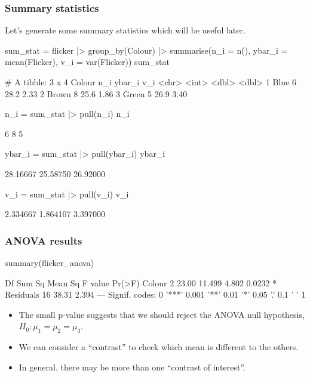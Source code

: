 \documentclass[a4paper]{article}\usepackage[]{graphicx}\usepackage[]{xcolor}
\begin{document}
\subsubsection{Summary statistics}
Let's generate some summary statistics which will be useful later.
\begin{Schunk}
\begin{Sinput}
sum_stat = flicker |> group_by(Colour) |>
  summarise(n_i = n(),
            ybar_i = mean(Flicker),
            v_i = var(Flicker))
sum_stat
\end{Sinput}
\begin{Soutput}
# A tibble: 3 x 4
  Colour   n_i ybar_i   v_i
  <chr>  <int>  <dbl> <dbl>
1 Blue       6   28.2  2.33
2 Brown      8   25.6  1.86
3 Green      5   26.9  3.40
\end{Soutput}
\begin{Sinput}
n_i = sum_stat |> pull(n_i)
n_i
\end{Sinput}
\begin{Soutput}
[1] 6 8 5
\end{Soutput}
\begin{Sinput}
ybar_i = sum_stat |> pull(ybar_i)
ybar_i
\end{Sinput}
\begin{Soutput}
[1] 28.16667 25.58750 26.92000
\end{Soutput}
\begin{Sinput}
v_i = sum_stat |> pull(v_i)
v_i
\end{Sinput}
\begin{Soutput}
[1] 2.334667 1.864107 3.397000
\end{Soutput}
\end{Schunk}
\subsubsection{ANOVA results}
\begin{Schunk}
\begin{Sinput}
summary(flicker_anova)
\end{Sinput}
\begin{Soutput}
            Df Sum Sq Mean Sq F value Pr(>F)  
Colour       2  23.00  11.499   4.802 0.0232 *
Residuals   16  38.31   2.394                 
---
Signif. codes:  0 '***' 0.001 '**' 0.01 '*' 0.05 '.' 0.1 ' ' 1
\end{Soutput}
\end{Schunk}
\begin{itemize}
	\item The small p-value suggests that we should reject the ANOVA null hypothesis, \( H_0: \mu_1 = \mu_2 = \mu_3 \).
	\item We can consider a ``contrast'' to check which mean is different to the others.
	\item In general, there may be more than one ``contrast of interest''.
\end{itemize}
\end{document}
